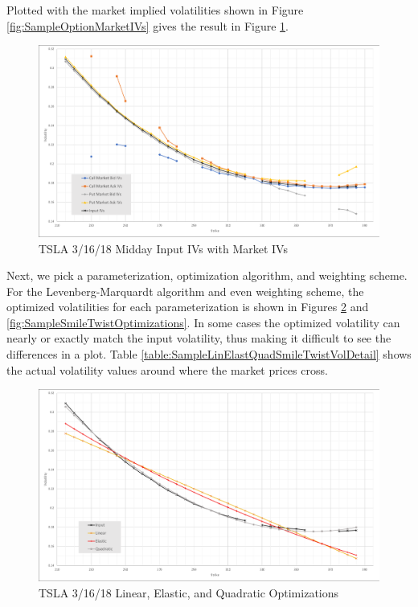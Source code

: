 \documentclass[12pt, a4paper, notitlepage]{article}
\numberwithin{equation}{subsection}
\numberwithin{figure}{subsection}
\numberwithin{table}{subsection}
\begin{document}
Plotted with the market implied volatilities shown in Figure \ref{fig:SampleOptionMarketIVs} gives the result in Figure \ref{fig:SampleInputIvsWithMarketIvs}.

\begin{figure}[H]
	\caption{TSLA 3/16/18 Midday Input IVs with Market IVs}
	\centerline{\includegraphics[width=1\textwidth]{SampleInputAndMktIVs}}
	\label{fig:SampleInputIvsWithMarketIvs}
\end{figure}

Next, we pick a parameterization, optimization algorithm, and weighting scheme.  For the Levenberg-Marquardt algorithm and even weighting scheme, the optimized volatilities for each parameterization is shown in Figures \ref{fig:SampleLinElastQuadOptimizations} and \ref{fig:SampleSmileTwistOptimizations}.  In some cases the optimized volatility can nearly or exactly match the input volatility, thus making it difficult to see the differences in a plot.  Table \ref{table:SampleLinElastQuadSmileTwistVolDetail} shows the actual volatility values around where the market prices cross.

\begin{figure}[H]
	\caption{TSLA 3/16/18 Linear, Elastic, and Quadratic Optimizations}
	\centerline{\includegraphics[width=1\textwidth]{SampleLinElastQuadOptimizations}}
	\label{fig:SampleLinElastQuadOptimizations}
\end{figure}
\end{document}
